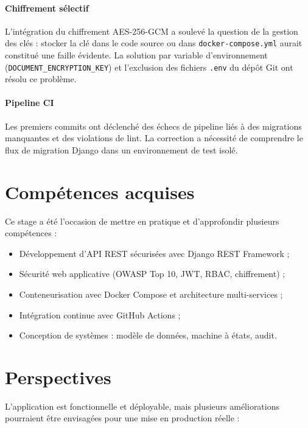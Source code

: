 \paragraph{Chiffrement sélectif} L'intégration du chiffrement AES-256-GCM a
soulevé la question de la gestion des clés : stocker la clé dans le code source
ou dans \texttt{docker-compose.yml} aurait constitué une faille évidente.
La solution par variable d'environnement (\texttt{DOCUMENT\_ENCRYPTION\_KEY})
et l'exclusion des fichiers \texttt{.env} du dépôt Git ont résolu ce problème.

\paragraph{Pipeline CI} Les premiers commits ont déclenché des échecs de pipeline
liés à des migrations manquantes et des violations de lint. La correction a nécessité
de comprendre le flux de migration Django dans un environnement de test isolé.

\section*{Compétences acquises}

Ce stage a été l'occasion de mettre en pratique et d'approfondir plusieurs
compétences :

\begin{itemize}
    \item Développement d'API REST sécurisées avec Django REST Framework ;
    \item Sécurité web applicative (OWASP Top 10, JWT, RBAC, chiffrement) ;
    \item Conteneurisation avec Docker Compose et architecture multi-services ;
    \item Intégration continue avec GitHub Actions ;
    \item Conception de systèmes : modèle de données, machine à états, audit.
\end{itemize}

\section*{Perspectives}

L'application est fonctionnelle et déployable, mais plusieurs améliorations
pourraient être envisagées pour une mise en production réelle :

